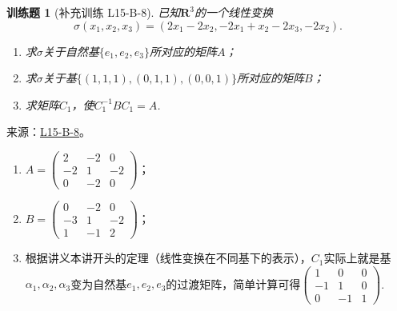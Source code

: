 \documentclass[12pt,fontset=fandol]{ctexart}
\newtheorem{exercise}{训练题}[section]
\begin{document}
\begin{exercise}[补充训练 L15-B-8]\label{prob:L15-B-8}
已知$\mathbf{R}^3$的一个线性变换
        \[\sigma(x_1,x_2,x_3)=(2x_1-2x_2,-2x_1+x_2-2x_3,-2x_2).\]
        \begin{enumerate}
            \item 求$\sigma$关于自然基$\{e_1,e_2,e_3\}$所对应的矩阵$A$；

            \item 求$\sigma$关于基$\{(1,1,1),(0,1,1),(0,0,1)\}$所对应的矩阵$B$；

            \item 求矩阵$C_1$，使$C_1^{-1}BC_1=A$.
        \end{enumerate}
\end{exercise}
\noindent 来源：\href{https://github.com/yhwu-is/Linear-Algebra-Left-Undone/blob/new/%E8%AE%B2%E4%B9%89/%E4%B8%93%E9%A2%98/15%20%E7%9B%B8%E4%BC%BC%E6%A0%87%E5%87%86%E5%BD%A2%EF%BC%9A%E5%A4%8D%E6%95%B0%E5%9F%9F%E4%B8%8A%E7%9A%84%E5%B0%9D%E8%AF%95%E4%B8%8E%E7%90%86%E8%AE%BA.tex}{L15-B-8}。
\begin{solve}
\begin{enumerate}
                \item $A=\begin{pmatrix}
                              2 & -2 & 0 \\ -2 & 1 & -2 \\ 0 & -2 & 0
                          \end{pmatrix}$；

                \item $B=\begin{pmatrix}
                              0 & -2 & 0 \\ -3 & 1 & -2 \\ 1 & -1 & 2
                          \end{pmatrix}$；

                \item 根据讲义本讲开头的定理（线性变换在不同基下的表示），$C_1$实际上就是基$\alpha_1,\alpha_2,\alpha_3$变为自然基$e_1,e_2,e_3$的过渡矩阵，简单计算可得$\begin{pmatrix}
                              1 & 0 & 0 \\ -1 & 1 & 0 \\ 0 & -1 & 1
                          \end{pmatrix}$.
            \end{enumerate}
\end{solve}
\end{document}
